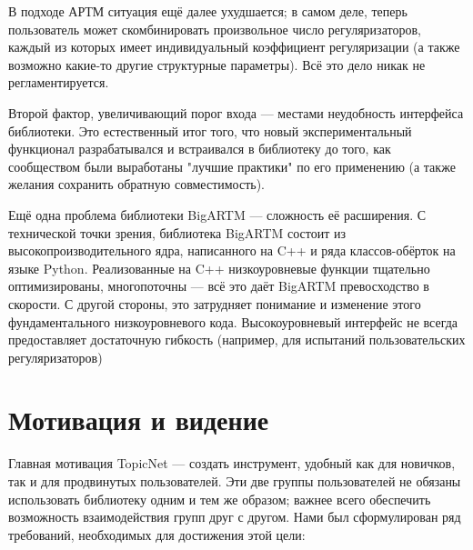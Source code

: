 В подходе АРТМ ситуация ещё далее ухудшается; в самом деле, теперь пользователь может скомбинировать произвольное число регуляризаторов, каждый из которых имеет индивидуальный коэффициент регуляризации (а также возможно какие-то другие структурные параметры). Всё это дело никак не регламентируется.

Второй фактор, увеличивающий порог входа --- местами неудобность интерфейса библиотеки. Это естественный итог того, что новый экспериментальный функционал разрабатывался и встраивался в библиотеку до того, как сообществом были выработаны "лучшие практики" по его применению (а также желания сохранить обратную совместимость). 


Ещё одна проблема библиотеки BigARTM --- сложность её расширения. С технической точки зрения, библиотека BigARTM состоит из высокопроизводительного ядра, написанного на C++ и ряда классов-обёрток на языке Python. Реализованные на C++ низкоуровневые функции тщательно оптимизированы, многопоточны --- всё это даёт BigARTM превосходство в скорости. С другой стороны, это затрудняет понимание и изменение этого фундаментального низкоуровневого кода. Высокоуровневый интерфейс не всегда предоставляет достаточную гибкость (например, для испытаний пользовательских регуляризаторов)

\section{Мотивация и видение}

Главная мотивация TopicNet --- создать инструмент, удобный как для новичков, так и для продвинутых пользователей. Эти две группы пользователей не обязаны использовать библиотеку одним и тем же образом; важнее всего обеспечить возможность взаимодействия групп друг с другом. Нами был сформулирован ряд требований, необходимых для достижения этой цели:

